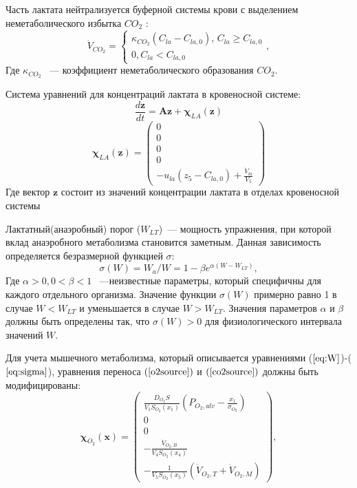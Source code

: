 Часть лактата нейтрализуется буферной системы крови с выделением неметаболического избытка \(CO_{2} \) :
\begin{equation}
\dot{V}_{CO_{2}}=
\begin{cases}
\kappa_{CO_{2}}\left(C_{la}-C_{la,0}\right), \, C_{la} \geq C_{la,0} \\
0, C_{la} < C_{la,0}
\end{cases},
\end{equation}
Где \(\kappa_{CO_{2}} \) ~--- коэффициент неметаболического образования \(CO_{2} \).

Система уравнений для концентраций лактата в кровеносной системе:
\begin{equation}
\frac{d\textbf{z}}{dt}=\textbf{A} \textbf{z}+\mathbf{\chi}_{LA}(\textbf{z})
\label{laEq}
\end{equation}
\begin{equation}
\mathbf{\chi}_{LA}(\textbf{z})=\begin{pmatrix}
0 \\
0 \\
0 \\
0 \\
\displaystyle -u_{la}(z_{5}-C_{la,0})+\frac{\dot{V}_{la}}{V_{5}}
\end{pmatrix}
\end{equation}
Где вектор \(\textbf{z}\) состоит из значений концентрации лактата в отделах кровеносной системы

Лактатный(анаэробный) порог ($W_{LT}$)~--- мощность упражнения, при которой вклад анаэробного метаболизма становится заметным. Данная зависимость определяется безразмерной функцией $\sigma$:
\begin{equation} \label{eq:sigma}
\sigma\left(W\right) = W_{a} / W = 1-\beta e^{\alpha(W-W_{LT})},
\end{equation}
Где $\alpha > 0, 0 < \beta < 1$  ~---неизвестные параметры, который специфичны для каждого отдельного организма. Значение функции $\sigma\left(W\right)$ примерно равно 1 в случае $W < W_{LT}$ и уменьшается в случае $W > W_{LT}$. Значения параметров $\alpha$ и $\beta$ должны быть определены так, что $\sigma\left(W\right) > 0$ для физиологического интервала значений $W$.

Для учета мышечного метаболизма, который описывается уравнениями ($\ref{eq:W}$)-($\ref{eq:sigma}$), уравнения переноса $(\ref{o2source})$ и $(\ref{co2source})$ должны быть модифицированы:
\begin{equation} \label{o2sourceLa}
\mathbf{\chi}_{O_{2}}(\textbf{x})=\begin{pmatrix}
\displaystyle \frac{D_{O_{2}}S}{V_{1}S_{O_{2}}(x_{1})}\left(P_{O_{2},alv}-\frac{x_{1}}{\sigma_{O_{2}}} \right) \\
0 \\
0 \\
\displaystyle -\frac{\dot{V}_{O_{2},B}}{V_{4}S_{O_{2}}(x_{4})} \\
\displaystyle -\frac{1}{V_{5}S_{O_{2}}(x_{5})}\left(\dot{V}_{O_{2},T}+\dot{V}_{O_{2},M}\right)
\end{pmatrix},
\end{equation}

